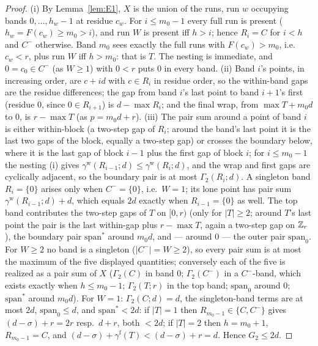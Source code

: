 \begin{proof}
(i) By Lemma~\ref{lem:E1}, $X$ is the union of the runs, run $w$
occupying bands $0,\dots,h_w-1$ at residue $c_w$. For $i\le m_0-1$ every
full run is present ($h_w=F(c_w)\ge m_0>i$), and run $W$ is present iff
$h>i$; hence $R_i=C$ for $i<h$ and $C^-$ otherwise. Band $m_0$ sees
exactly the full runs with $F(c_w)>m_0$, i.e.\ $c_w<r$, plus run $W$ iff
$h>m_0$: that is $T$. The nesting is immediate, and $0=c_0\in C^-$ (as
$W\ge1$) with $0<r$ puts $0$ in every band. (ii) Band $i$'s points, in
increasing order, are $c+id$ with $c\in R_i$ in residue order, so the
within-band gaps are the residue differences; the gap from band $i$'s
last point to band $i{+}1$'s first (residue $0$, since $0\in
R_{i+1}$) is $d-\max R_i$; and the final wrap, from $\max T+m_0d$ to
$0$, is $r-\max T$ (as $p=m_0d+r$). (iii) The pair sum around a point
of band $i$ is either within-block (a two-step gap of $R_i$; around the
band's last point it is the last two gaps of the block, equally a
two-step gap) or crosses the boundary below, where it is the last gap
of block $i-1$ plus the first gap of block $i$; for $i\le m_0-1$ the
nesting (i) gives $\gamma^{\mathrm w}(R_{i-1};d)\le\gamma^{\mathrm
w}(R_i;d)$, and the wrap and first gaps are cyclically adjacent, so the
boundary pair is at most $\Gamma_2(R_i;d)$. A singleton band $R_i=\{0\}$
arises only when $C^-=\{0\}$, i.e.\ $W=1$; its lone point has pair sum
$\gamma^{\mathrm w}(R_{i-1};d)+d$, which equals $2d$ exactly when
$R_{i-1}=\{0\}$ as well. The top band contributes the two-step gaps of
$T$ on $[0,r)$ (only for $|T|\ge2$; around $T$'s last point the pair is
the last within-gap plus $r-\max T$, again a two-step gap on $\mathbb{Z}_r$),
the boundary pair $\mathrm{span}^\ast$ around $m_0d$, and --- around
$0$ --- the outer pair $\mathrm{span}_0$. For $W\ge2$ no band is a
singleton ($|C^-|=W\ge2$), so every pair sum is at most the maximum of
the five displayed quantities; conversely each of the five is realized
as a pair sum of $X$ ($\Gamma_2(C)$ in band $0$; $\Gamma_2(C^-)$ in a
$C^-$-band, which exists exactly when $h\le m_0-1$; $\Gamma_2(T;r)$ in
the top band; $\mathrm{span}_0$ around $0$; $\mathrm{span}^\ast$ around
$m_0d$). For $W=1$: $\Gamma_2(C;d)=d$, the singleton-band terms are at
most $2d$, $\mathrm{span}_0\le d$, and $\mathrm{span}^\ast<2d$: if $|T|=1$
then $R_{m_0-1}\in\{C,C^-\}$ gives $(d-\sigma)+r=2r$ resp.\ $d+r$,
both $<2d$; if $|T|=2$ then $h=m_0+1$, $R_{m_0-1}=C$, and
$(d-\sigma)+\gamma^{\mathrm f}(T)<(d-\sigma)+r=d$. Hence $G_2\le2d$.
\end{proof}

